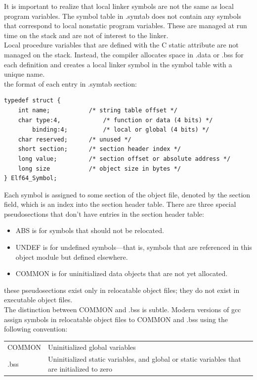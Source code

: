 \documentclass[11pt]{article}
\begin{document}
It is important to realize that local linker symbols are not the same as local program variables. The symbol table in .symtab does not contain any symbols that correspond to local nonstatic program variables. These are managed at run time on the stack and are not of interest to the linker.\\


Local procedure variables that are defined with the C static attribute are not managed on the stack. Instead, the compiler allocates space in .data or .bss for each definition and creates a local linker symbol in the symbol table with a unique name.\\


the format of each entry in .symtab section:\\
\begin{verbatim}
typedef struct {
    int name;			/* string table offset */
    char type:4,			/* function or data (4 bits) */
        binding:4;			/* local or global (4 bits) */
    char reserved;		/* unused */
    short section;		/* section header index */
    long value;			/* section offset or absolute address */
    long size			/* object size in bytes */
} Elf64_Symbol;
\end{verbatim}

Each symbol is assigned to some section of the object file, denoted by the section field, which is an index into the section header table. There are three special pseudosections that don’t have entries in the section header table:\\
\begin{itemize}
\item ABS is for symbols that should not be relocated.\\
\item UNDEF is for undefined symbols—that is, symbols that are referenced in this object module but defined elsewhere.\\
\item COMMON is for uninitialized data objects that are not yet allocated.\\
\end{itemize}
these pseudosections exist only in relocatable object files; they do not exist in executable object files.\\

The distinction between COMMON and .bss is subtle. Modern versions of gcc assign symbols in relocatable object files to COMMON and .bss using the following convention:\\
\begin{center}
\begin{tabular}{ll}
COMMON & Uninitialized global variables\\
.bss & Uninitialized static variables, and global or static variables that are initialized to zero\\
\end{tabular}
\end{center}
\end{document}
